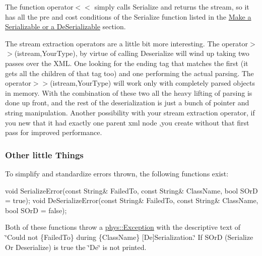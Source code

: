  The function operator$<$$<$ simply calls Serialize and returns the stream, so it has all the pre and cost conditions of the Serialize function listed in the \hyperlink{Serialization_serializationmaking}{Make a Serializable or a DeSerializable} section. \par
 \par
 The stream extraction operators are a little bit more interesting. The operator$>$$>$(istream,YourType), by virtue of calling Deserialize will wind up taking two passes over the XML. One looking for the ending tag that matches the first (it gets all the children of that tag too) and one performing the actual parsing. The operator$>$$>$(istream,YourType) will work only with completely parsed objects in memory. With the combination of these two all the heavy lifting of parsing is done up front, and the rest of the deserialization is just a bunch of pointer and string manipulation. Another possibility with your stream extraction operator, if you new that it had exactly one parent xml node ,you create without that first pass for improved performance. \hypertarget{Serialization_serializationmisc}{}\subsubsection{Other little Things}\label{Serialization_serializationmisc}
To simplify and standardize errors thrown, the following functions exist: 
\begin{DoxyCode}
 void SerializeError(const String& FailedTo, const String& ClassName, bool SOrD =
       true);
 void DeSerializeError(const String& FailedTo, const String& ClassName, bool SOrD
       = false);
\end{DoxyCode}
 Both of these functions throw a \hyperlink{classphys_1_1Exception}{phys::Exception} with the descriptive text of \char`\"{}Could not \{FailedTo\} during \{ClassName\} \mbox{[}De\mbox{]}Serialization.\char`\"{} If SOrD (Serialize Or Deserialize) is true the \char`\"{}De\char`\"{} is not printed. 